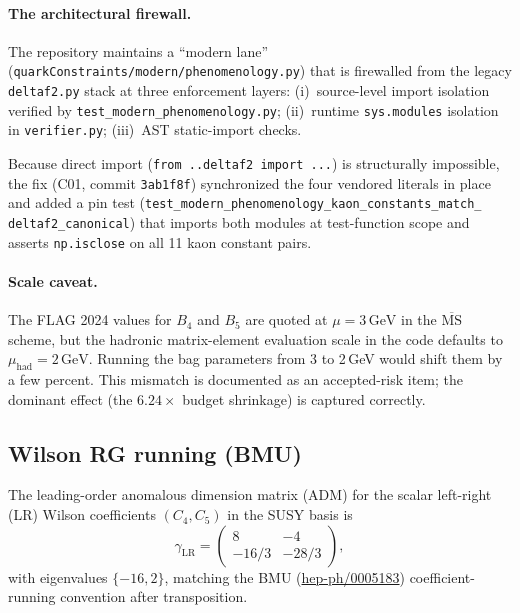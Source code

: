 \documentclass[11pt]{article}
\begin{document}
\paragraph{The architectural firewall.}
The repository maintains a ``modern lane''
(\texttt{quarkConstraints/modern/phenomenology.py}) that is firewalled
from the legacy \texttt{deltaf2.py} stack at three enforcement layers:
(i)~source-level import isolation verified by
\texttt{test\_modern\_phenomenology.py};
(ii)~runtime \texttt{sys.modules} isolation in \texttt{verifier.py};
(iii)~AST static-import checks.

Because direct import (\texttt{from ..deltaf2 import ...}) is
structurally impossible, the fix (C01, commit \texttt{3ab1f8f})
synchronized the four vendored literals in place and added a pin test
(\texttt{test\_modern\_phenomenology\_kaon\_constants\_match\_%
deltaf2\_canonical}) that imports both modules at test-function scope
and asserts \texttt{np.isclose} on all 11 kaon constant pairs.

\paragraph{Scale caveat.}
The FLAG 2024 values for $B_4$ and $B_5$ are quoted at
$\mu = 3\,\mathrm{GeV}$ in the $\overline{\mathrm{MS}}$ scheme, but
the hadronic matrix-element evaluation scale in the code defaults to
$\mu_{\mathrm{had}} = 2\,\mathrm{GeV}$.  Running the bag parameters
from 3 to 2\,GeV would shift them by a few percent.  This mismatch is
documented as an accepted-risk item; the dominant effect (the
$6.24\times$ budget shrinkage) is captured correctly.


\subsection{Wilson RG running (BMU)}
\label{sec:bmu}

The leading-order anomalous dimension matrix (ADM) for the scalar
left-right (LR) Wilson coefficients $(C_4, C_5)$ in the SUSY basis is
\begin{equation}\label{eq:adm-lr}
  \gamma_{\mathrm{LR}} = \begin{pmatrix} 8 & -4 \\
  -16/3 & -28/3 \end{pmatrix},
\end{equation}
with eigenvalues $\{-16, 2\}$, matching the BMU
(\href{https://arxiv.org/abs/hep-ph/0005183}{hep-ph/0005183})
coefficient-running convention after transposition.
\end{document}
